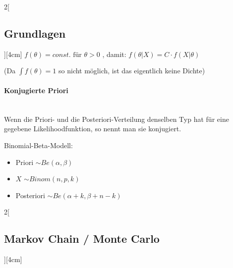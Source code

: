 \documentclass[8pt]{extarticle}
\begin{document}
\begin{multicols}{2}[\subsection{Grundlagen}][4cm]
$f(\theta)=const. \text{ für } \theta > 0$
,  damit:
 $f(\theta | X) = C \cdot f(X | \theta )$

\noindent (Da $\int f(\theta) =1$ so nicht möglich, ist das eigentlich keine Dichte)

\paragraph{Konjugierte Priori}

\begin{Extensiv}
~\\
  \noindent Wenn die Priori- und die Posteriori-Verteilung denselben Typ hat für eine gegebene Likelihoodfunktion, so nennt man sie konjugiert.
  
\end{Extensiv}

\vspace{1 em}
\noindent Binomial-Beta-Modell: \begin{itemize}
  \vspace{-0.7 em}
\setlength\itemsep{-0.7 em}
\item Priori $ \sim Be(\alpha,\beta)$
\item $X$ $ \sim Binom(n,p,k)$
\item Posteriori $\sim Be(\alpha + k, \beta + n - k)$
  
\end{itemize}

\end{multicols}


\begin{multicols}{2}[\subsection{Markov Chain / Monte Carlo}][4cm]



\end{multicols}
\end{document}
